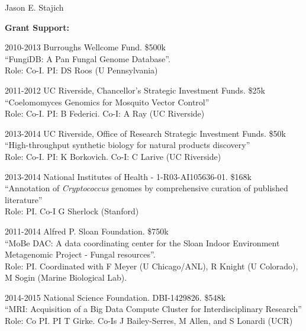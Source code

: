 \documentclass[10pt]{article}
\begin{document}
\begin{cv}{\centerline{Jason E. Stajich}}
\begin{cvlistcompact}{\bf Grant Support:}
\item [2010-2013] Burroughs Wellcome Fund. \$500k \\
 ``FungiDB: A Pan Fungal Genome Database''. \\
Role: Co-I. PI: DS Roos (U Pennsylvania)

\item [2011-2012] UC Riverside, Chancellor's Strategic Investment
  Funds. \$25k \\
``Coelomomyces Genomics for Mosquito Vector Control'' \\
Role: Co-I. PI: B Federici. Co-I: A Ray (UC Riverside)

\item [2013-2014] UC Riverside, Office of Research Strategic Investment
  Funds. \$50k \\
``High-throughput synthetic biology for natural products discovery'' \\
Role: Co-I. PI: K Borkovich. Co-I: C Larive (UC Riverside)

\item [2013-2014] National Institutes of Health - 1-R03-AI105636-01. \$168k \\
``Annotation of \textit{Cryptococcus} genomes by comprehensive
  curation of published literature'' \\
Role: PI. Co-I G Sherlock (Stanford)

  \item [2011-2014] Alfred P. Sloan Foundation. \$750k \\
``MoBe DAC: A data coordinating center for the Sloan Indoor
Environment Metagenomic Project - Fungal resources''. \\
Role: PI.  Coordinated with F Meyer (U Chicago/ANL), R Knight (U Colorado), M Sogin (Marine Biological Lab).

\item [2014-2015] National Science Foundation. DBI-1429826. \$548k \\
``MRI: Acquisition of a Big Data Compute Cluster for Interdisciplinary
  Research''
Role: Co PI. PI T Girke. Co-Is J Bailey-Serres, M Allen, and S Lonardi (UCR)

\setlength{\cvlabelwidth}{18mm}


\end{cvlistcompact}
\end{cv}
\end{document}
